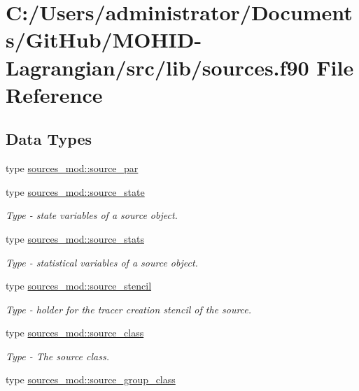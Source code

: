 \hypertarget{sources_8f90}{}\section{C\+:/\+Users/administrator/\+Documents/\+Git\+Hub/\+M\+O\+H\+I\+D-\/\+Lagrangian/src/lib/sources.f90 File Reference}
\label{sources_8f90}
\subsection*{Data Types}
\begin{DoxyCompactItemize}
\item 
type \hyperlink{structsources__mod_1_1source__par}{sources\+\_\+mod\+::source\+\_\+par}
\item 
type \hyperlink{structsources__mod_1_1source__state}{sources\+\_\+mod\+::source\+\_\+state}
\begin{DoxyCompactList}\small\item\em Type -\/ state variables of a source object. \end{DoxyCompactList}\item 
type \hyperlink{structsources__mod_1_1source__stats}{sources\+\_\+mod\+::source\+\_\+stats}
\begin{DoxyCompactList}\small\item\em Type -\/ statistical variables of a source object. \end{DoxyCompactList}\item 
type \hyperlink{structsources__mod_1_1source__stencil}{sources\+\_\+mod\+::source\+\_\+stencil}
\begin{DoxyCompactList}\small\item\em Type -\/ holder for the tracer creation stencil of the source. \end{DoxyCompactList}\item 
type \hyperlink{structsources__mod_1_1source__class}{sources\+\_\+mod\+::source\+\_\+class}
\begin{DoxyCompactList}\small\item\em Type -\/ The source class. \end{DoxyCompactList}\item 
type \hyperlink{structsources__mod_1_1source__group__class}{sources\+\_\+mod\+::source\+\_\+group\+\_\+class}
\end{DoxyCompactItemize}

